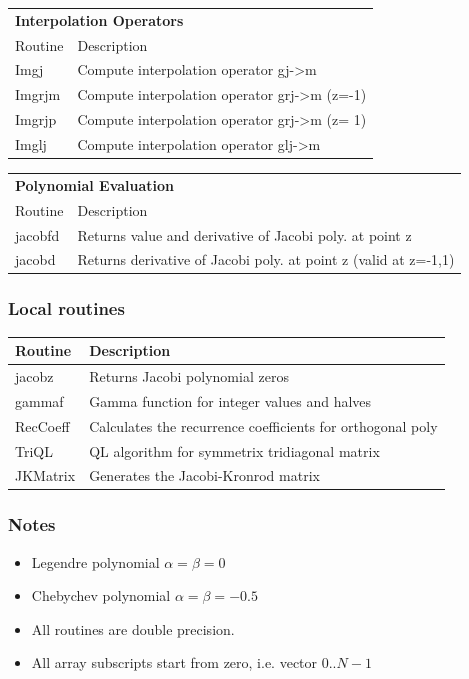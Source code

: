 \begin{tabular}{ll}
\toprule
\multicolumn{2}{l}{\textbf{Interpolation Operators}} \\
Routine & Description \\
\midrule
Imgj & Compute interpolation operator gj->m \\
Imgrjm & Compute interpolation operator grj->m (z=-1) \\
Imgrjp & Compute interpolation operator grj->m (z= 1) \\
Imglj & Compute interpolation operator glj->m \\
\bottomrule
\end{tabular}

\begin{tabular}{ll}
\toprule
\multicolumn{2}{l}{\textbf{Polynomial Evaluation}} \\
Routine & Description \\
\midrule
jacobfd & Returns value and derivative of Jacobi poly. at point z \\
jacobd & Returns derivative of Jacobi poly. at point z (valid at z=-1,1) \\
\bottomrule
\end{tabular}

\subsubsection{Local routines}
\begin{tabular}{ll}
\toprule
Routine & Description \\
\midrule
jacobz & Returns Jacobi polynomial zeros \\
gammaf & Gamma function for integer values and halves \\
RecCoeff & Calculates the recurrence coefficients for orthogonal poly \\
TriQL & QL algorithm for symmetrix tridiagonal matrix \\
JKMatrix & Generates the Jacobi-Kronrod matrix \\
\bottomrule
\end{tabular}

\subsubsection{Notes}
\begin{itemize}
\setlength{\itemsep}{0em}
\item Legendre polynomial $\alpha = \beta = 0$
\item Chebychev polynomial $\alpha = \beta = -0.5$
\item All routines are double precision.
\item All array subscripts start from zero, i.e. vector $0..N-1$
\end{itemize}



